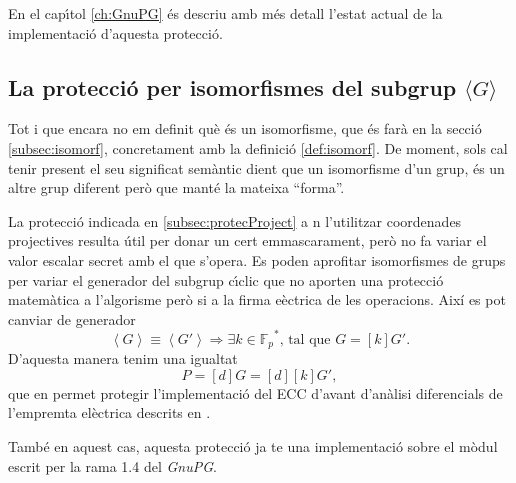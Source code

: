 \documentclass[12pt,twoside,catalan,a4paper]{book}%
\numberwithin{figure}{section}		%
\theoremstyle{definition}   			%
\def\sgc{subgrup c\'{\i}clic}%
\newcommand{\Fp}{\ensuremath{\mathbb{F}_p}}%
\theoremstyle{saltolinea}   			%
\begin{document}
En el cap\'{\i}tol \ref{ch:GnuPG} \'es descriu amb m\'es detall l'estat actual de la implementaci\'o d'aquesta protecci\'o.

\subsection{La protecci\'o per isomorfismes del subgrup $\langle G\rangle$}\label{subsec:protecIsomorf}

Tot i que encara no em definit qu\`e \'es un isomorfisme, que \'es far\`a en la secci\'o \ref{subsec:isomorf}, concretament amb la definici\'o \ref{def:isomorf}. De moment, sols cal tenir present el seu significat sem\`antic dient que un isomorfisme d'un grup, \'es un altre grup diferent per\`o que mant\'e la mateixa ``forma''.

La protecci\'o indicada en \ref{subsec:protecProject} a n l'utilitzar coordenades projectives resulta \'util per donar un cert emmascarament, per\`o no fa variar el valor escalar secret amb el que s'opera. Es poden aprofitar isomorfismes de grups per variar el generador del \sgc{} que no aporten una protecci\'o matem\`atica a l'algorisme per\`o si a la firma e\lgem{}\`ectrica de les operacions. Aix\'i es pot canviar de generador
$$\left\langle G\right\rangle \equiv\left\langle G'\right\rangle \Longrightarrow\exists k\in\Fp^*\text{, tal que }G=[k]G'.$$
D'aquesta manera tenim una igualtat
$$P= \left[d\right]G = \left[d\right]\left[k\right]G',$$
que en permet protegir l'implementaci\'o del ECC d'avant d'an\`alisi diferencials de l'empremta el\`ectrica descrits en \cite{KJJ}.

Tamb\'e en aquest cas, aquesta protecci\'o ja te una implementaci\'o sobre el m\`odul escrit per la rama 1.4 del \emph{GnuPG}.


\end{document}
